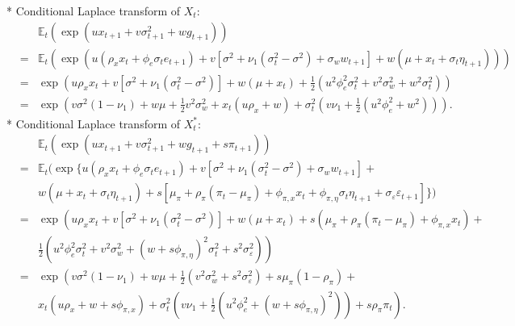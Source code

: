 \label{slide:proofaffineBY}


	* Conditional Laplace transform of $X_t$:\hyperlink{slide:BYaffine}{}
	\begin{eqnarray*}
	&& \mathbb{E}_t(\exp(u x_{t+1} + v \sigma^2_{t+1} + w g_{t+1}))\\
	&=& \mathbb{E}_t(\exp(u (\rho_x x_t + \phi_e \sigma_t e_{t+1}) + v [\sigma^2 + \nu_1(\sigma^2_t -\sigma^2) + \sigma_w w_{t+1}] + w (\mu + x_t + \sigma_t \eta_{t+1})))\\
	&=& \exp\left(u \rho_x x_t + v [\sigma^2 + \nu_1(\sigma^2_t -\sigma^2)] + w (\mu + x_t) + \frac{1}{2}(u^2 \phi_e^2 \sigma_t^2+v^2 \sigma_w^2 + w^2 \sigma_t^2) \right)\\
	&=& \exp\left(
	v \sigma^2 (1 - \nu_1) + w \mu + \frac{1}{2}v^2 \sigma_w^2 + x_t(u \rho_x +  w) + \sigma_t^2\left(v \nu_1+ \frac{1}{2}(u^2 \phi_e^2 + w^2)\right)
	\right).
	\end{eqnarray*}
	* Conditional Laplace transform of $X_t^*$:\hyperlink{slide:BYaugment}{}
	\begin{eqnarray*}
	&& \mathbb{E}_t(\exp(u x_{t+1} + v \sigma^2_{t+1} + w g_{t+1} + s \pi_{t+1}))\\
	&=& \mathbb{E}_t(\exp\{u (\rho_x x_t + \phi_e \sigma_t e_{t+1}) + v [\sigma^2 + \nu_1(\sigma^2_t -\sigma^2) + \sigma_w w_{t+1}] + \\
	&& w (\mu + x_t + \sigma_t \eta_{t+1}) +
	s [ \mu_\pi + \rho_{\pi} (\pi_{t} - \mu_\pi) + \phi_{\pi,x} x_{t} + \phi_{\pi,\eta} \sigma_t \eta_{t+1} + \sigma_\varepsilon \varepsilon_{t+1}]\})\\
	&=& \exp\left(u \rho_x x_t + v [\sigma^2 + \nu_1(\sigma^2_t -\sigma^2)] + w (\mu + x_t) + s ( \mu_\pi + \rho_{\pi} (\pi_{t} - \mu_\pi) + \phi_{\pi,x} x_{t}) +  \right. \\
	&& \left. \frac{1}{2}\left(u^2 \phi_e^2 \sigma_t^2+v^2 \sigma_w^2 + (w+s \phi_{\pi,\eta})^2 \sigma_t^2 + s^2 \sigma_\varepsilon^2\right) \right)\\
	&=& \exp\left(
	v \sigma^2 (1 - \nu_1) + w \mu + \frac{1}{2}\left(v^2 \sigma_w^2+s^2 \sigma_\varepsilon^2\right) +
	s \mu_\pi (1 - \rho_\pi) + \right. \\
	&& \left. x_t(u \rho_x +  w + s\phi_{\pi,x}) + \sigma_t^2\left(v \nu_1+ \frac{1}{2}(u^2 \phi_e^2 + (w+s \phi_{\pi,\eta})^2)\right) + s \rho_\pi \pi_t
	\right).
	\end{eqnarray*}





